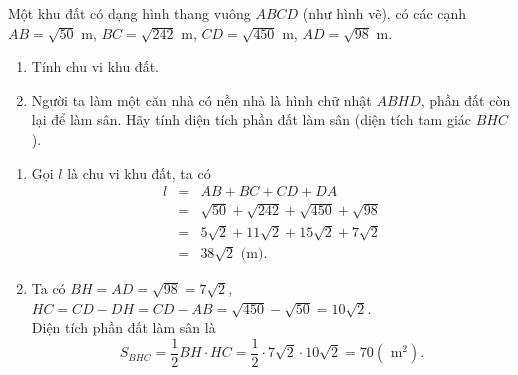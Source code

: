 \begin{bt}%
\immini
{
	Một khu đất có dạng hình thang vuông $ABCD$ (như hình vẽ), có các cạnh $AB=\sqrt{50}$ m, $BC=\sqrt{242}$ m, $CD=\sqrt{450}$ m, $AD=\sqrt{98}$ m.
	\begin{enumerate}
		\item Tính chu vi khu đất.
		\item Người ta làm một căn nhà có nền nhà là hình chữ nhật $ABHD$, phần đất còn lại để làm sân. Hãy tính diện tích phần đất làm sân (diện tích tam giác $BHC$).
	\end{enumerate}
}
{
}
	\loigiai
	{
		\begin{enumerate}
		\item Gọi $\mathit{l}$ là chu vi khu đất, ta có 
		\begin{eqnarray*}
			\mathit{l}&=&AB+BC+CD+DA\\
			&=&\sqrt{50}+\sqrt{242}+\sqrt{450}+\sqrt{98}\\
			&=&5\sqrt{2}+11\sqrt{2}+15\sqrt{2}+7\sqrt{2}\\
			&=&38\sqrt{2}\text{ (m)}.
		\end{eqnarray*}
		\item Ta có $BH=AD=\sqrt{98}=7\sqrt{2}$, $HC=CD-DH=CD-AB=\sqrt{450}-\sqrt{50}=10\sqrt{2}$.\\
		Diện tích phần đất làm sân là 
		$$S_{BHC}=\dfrac{1}{2}BH\cdot HC=\dfrac{1}{2}\cdot 7\sqrt{2}\cdot 10\sqrt{2}=70(\text{ m}^2).$$
	\end{enumerate}
	}
\end{bt}
